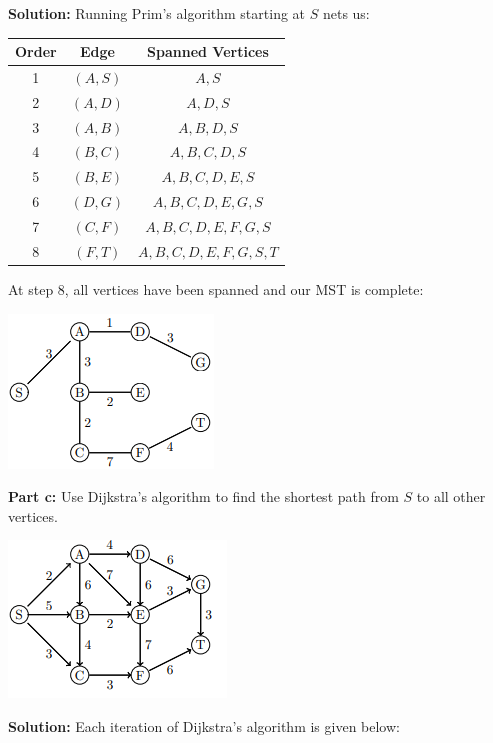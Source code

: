 \documentclass{article}
\begin{document}
\noindent\textbf{Solution:} Running Prim's algorithm starting at $S$ nets us:
\begin{center}
\begin{tabular}{c|c|c}
  \textbf{Order} & \textbf{Edge} & \textbf{Spanned Vertices}\\
  \hline
  1 & $(A,S)$ & $A,S$\\
  \hline
  2 & $(A,D)$ & $A,D,S$\\
  \hline
  3 & $(A,B)$ & $A,B,D,S$\\
  \hline
  4 & $(B,C)$ & $A,B,C,D,S$\\
  \hline
  5 & $(B,E)$ & $A,B,C,D,E,S$\\
  \hline
  6 & $(D,G)$ & $A,B,C,D,E,G,S$\\
  \hline
  7 & $(C,F)$ & $A,B,C,D,E,F,G,S$\\
  \hline
  8 & $(F,T)$ & $A,B,C,D,E,F,G,S,T$
\end{tabular}
\end{center}
\smallskip

At step 8, all vertices have been spanned and our MST is complete:
\begin{center}
  \includegraphics{graph4bMST.png}
\end{center}
\bigskip

\noindent\textbf{Part c:} Use Dijkstra’s algorithm to find the shortest path from $S$ to all other vertices.
\begin{center}
  \includegraphics{graph4c.png}
\end{center}
\bigskip

\noindent\textbf{Solution:} Each iteration of Dijkstra’s algorithm is given below:
\bigskip
\end{document}
